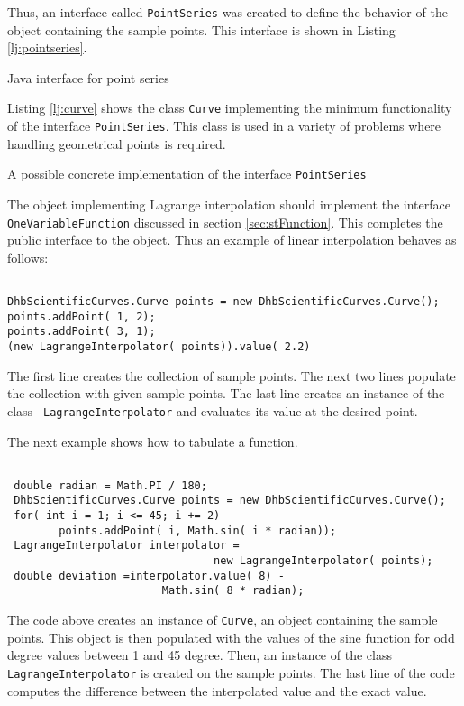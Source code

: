 \documentclass[twoside]{book}
\begin{document}
Thus, an interface called {\tt PointSeries} was created to define
the behavior of the object containing the sample points. This
interface is shown in Listing \ref{lj:pointseries}.

\begin{listing}
Java interface for point series
\label{lj:pointseries}

\end{listing}
Listing \ref{lj:curve} shows the class {\tt Curve} implementing
the minimum functionality of the interface {\tt PointSeries}. This
class is used in a variety of problems where handling geometrical
points is required.
\begin{listing}
A possible concrete implementation of the interface {\tt PointSeries}
\label{lj:curve}

\end{listing}
The object implementing Lagrange interpolation should implement
the interface {\tt OneVariableFunction} discussed in section
\ref{sec:stFunction}. This completes the public interface to the
object. Thus an example of linear interpolation behaves as
follows:
\begin{codeExample} \label{ex:lagrangeJ1}
\begin{verbatim}

DhbScientificCurves.Curve points = new DhbScientificCurves.Curve();
points.addPoint( 1, 2);
points.addPoint( 3, 1);
(new LagrangeInterpolator( points)).value( 2.2)
\end{verbatim}
\end{codeExample}
The first line creates the collection of sample points. The next
two lines populate the collection with given sample points. The
last line creates an instance of the class {\tt
LagrangeInterpolator} and evaluates its value at the desired
point.

The next example shows how to tabulate a function.
\begin{codeExample} \label{ex:lagrangeJ2}
\begin{verbatim}

 double radian = Math.PI / 180;
 DhbScientificCurves.Curve points = new DhbScientificCurves.Curve();
 for( int i = 1; i <= 45; i += 2)
        points.addPoint( i, Math.sin( i * radian));
 LagrangeInterpolator interpolator =
                                new LagrangeInterpolator( points);
 double deviation =interpolator.value( 8) -
                        Math.sin( 8 * radian);
\end{verbatim}
\end{codeExample}
The code above creates an instance of {\tt Curve}, an object
containing the sample points. This object is then populated with
the values of the sine function for odd degree values between 1
and 45 degree. Then, an instance of the class {\tt
LagrangeInterpolator} is created on the sample points. The last
line of the code computes the difference between the interpolated
value and the exact value.
\end{document}
